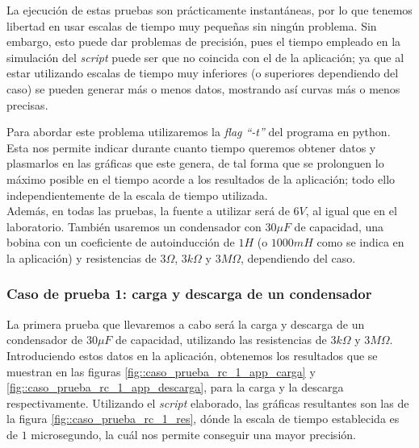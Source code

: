 \documentclass[../main.tex]{subfiles}
\begin{document}
La ejecución de estas pruebas son prácticamente instantáneas, por lo que tenemos libertad en usar escalas de tiempo muy pequeñas sin ningún problema. Sin embargo, esto puede dar problemas de precisión, pues el tiempo empleado en la simulación del \textit{script} puede ser que no coincida con el de la aplicación; ya que al estar utilizando escalas de tiempo muy inferiores (o superiores dependiendo del caso) se pueden generar más o menos datos, mostrando así curvas más o menos precisas. 

Para abordar este problema utilizaremos la \textit{flag ``-t''} del programa en python. Esta nos permite indicar durante cuanto tiempo queremos obtener datos y plasmarlos en las gráficas que este genera, de tal forma que se prolonguen lo máximo posible en el tiempo acorde a los resultados de la aplicación; todo ello independientemente de la escala de tiempo utilizada.\\ 




Además, en todas las pruebas, la fuente a utilizar será de $6V$, al igual que en el laboratorio. También usaremos un condensador con $30 \mu F$ de capacidad, una bobina con un coeficiente de autoinducción de $1H$ (o $1000mH$ como se indica en la aplicación) y resistencias de $3\Omega$, $3k \Omega$ y $3M \Omega$, dependiendo del caso. 



\subsubsection{Caso de prueba 1: carga y descarga de un condensador}
La primera prueba que llevaremos a cabo será la carga y descarga de un condensador de $30 \mu F$ de capacidad, utilizando las resistencias de $3k\Omega$ y $3M\Omega$. \\

Introduciendo estos datos en la aplicación, obtenemos los resultados que se muestran en las figuras \ref{fig::caso_prueba_rc_1_app_carga} y \ref{fig::caso_prueba_rc_1_app_descarga}, para la carga y la descarga respectivamente. Utilizando el \textit{script} elaborado, las gráficas resultantes son las de la figura \ref{fig::caso_prueba_rc_1_res}, dónde la escala de tiempo establecida es de $1$ microsegundo, la cuál nos permite conseguir una mayor precisión.\\
\end{document}
